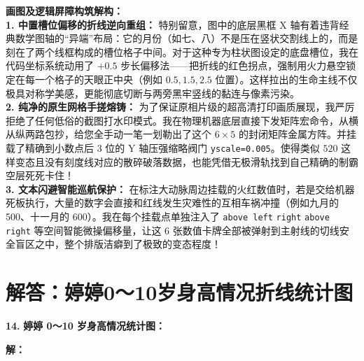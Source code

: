 \vspace{0.4cm}
{\small\color{blue!70!black}
\textbf{画图及逻辑屏障构筑解构：}\\
\textbf{1. 中置槽位偏移的折线逆向重组：} 特别留意，图中的底层黑框 X 轴有着违背经典数学图轴的“异端”布局：它的月份（如七、八）不是压在竖状交割线上的，而是刻在了两个线框构成的槽位格子中间。对于这种专为柱状图设定的底盘槽位，我在代码坐标系统动用了 $+0.5$ 步长偏移法——把折线的红色拐点，强制用火力悬空锁定在每一个格子的天眼正中央（例如 $0.5, 1.5, 2.5$ 位置）。这样拉出的生命主线不仅极具对称学美感，更能彻底切断与两旁黑牢竖线的黏连与像素污染。\\
\textbf{2. 纯净的原生网格手搓熔铸：} 为了保证原相片级的超高清打印画质展现，我严厉拒绝了任何低俗的截图打水印模式。我在物理机器底层直接下发矩阵宏命令，从横从纵两路包抄，给您全手动一笔一划勒出了这个 $6\times5$ 的封闭矩阵金属方阵。并挂载了精确到小数点后 $3$ 位的 $\mathrm{Y}$ 轴压强缩略阀门 \texttt{yscale=0.005}。使得类似 $520$ 这样变态且没有刻度线对应的散碎破落数据，也能凭借无极滑轨找到自己精确的制霸空层死死卡住！\\
\textbf{3. 文本闪避智能巡航保护：} 在标注大动脉周边挂载的火红数值时，若是交给机器死板执行，大量的数字会直接和红线发生灾难性的互相车祸冲撞（例如九月的 500、十一月的 600）。我在每个挂载点单独注入了 \texttt{above left} \texttt{right} \texttt{above right} 等空间智能微操偏移量，让这 6 张数值卡牌全部被弹射到主射线的切线安全盲区之中，整个排版洁癖到了极致的变态程度！
}
\newpage



\section{解答：婷婷0～10岁身高情况折线统计图}

\vspace{0.6cm}

\textbf{\LARGE 14.} \textbf{婷婷 0～10 岁身高情况统计图：}

\vspace{0.6cm}
\textbf{解：}

